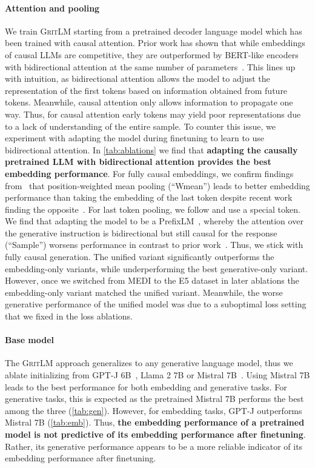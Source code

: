 \documentclass{article}
\newcommand{\model}{\textsc{GritLM}}
\newcommand{\llama}{Llama}
\begin{document}
\paragraph{Attention and pooling} We train \model{} starting from a pretrained decoder language model which has been trained with causal attention. Prior work has shown that while embeddings of causal LLMs are competitive, they are outperformed by BERT-like encoders with bidirectional attention at the same number of parameters~\cite{muennighoff2022sgpt,devlin2019bert}. This lines up with intuition, as bidirectional attention allows the model to adjust the representation of the first tokens based on information obtained from future tokens. Meanwhile, causal attention only allows information to propagate one way. Thus, for causal attention early tokens may yield poor representations due to a lack of understanding of the entire sample. To counter this issue, we experiment with adapting the model during finetuning to learn to use bidirectional attention. In \autoref{tab:ablations} we find that \textbf{adapting the causally pretrained LLM with bidirectional attention provides the best embedding performance}. For fully causal embeddings, we confirm findings from~\citet{muennighoff2022sgpt} that position-weighted mean pooling (``Wmean'') leads to better embedding performance than taking the embedding of the last token despite recent work finding the opposite~\cite{zhang2023language,ma2023finetuning}. For last token pooling, we follow \citet{zhang2023language} and use a special token. We find that adapting the model to be a PrefixLM~\cite{raffel2023exploring}, whereby the attention over the generative instruction is bidirectional but still causal for the response (``Sample'') worsens performance in contrast to prior work~\cite{wang2022language}. Thus, we stick with fully causal generation. The unified variant significantly outperforms the embedding-only variants, while underperforming the best generative-only variant. However, once we switched from MEDI to the E5 dataset in later ablations the embedding-only variant matched the unified variant. Meanwhile, the worse generative performance of the unified model was due to a suboptimal loss setting that we fixed in the loss ablations.

\paragraph{Base model} The \model{} approach generalizes to any generative language model, thus we ablate initializing from GPT-J 6B~\cite{wang2021gpt}, \llama{} 2 7B or Mistral 7B~\cite{jiang2023mistral}. Using Mistral 7B leads to the best performance for both embedding and generative tasks. For generative tasks, this is expected as the pretrained Mistral 7B performs the best among the three (\autoref{tab:gen}). However, for embedding tasks, GPT-J outperforms Mistral 7B (\autoref{tab:emb}). Thus, \textbf{the embedding performance of a pretrained model is not predictive of its embedding performance after finetuning}. Rather, its generative performance appears to be a more reliable indicator of its embedding performance after finetuning.
\end{document}

